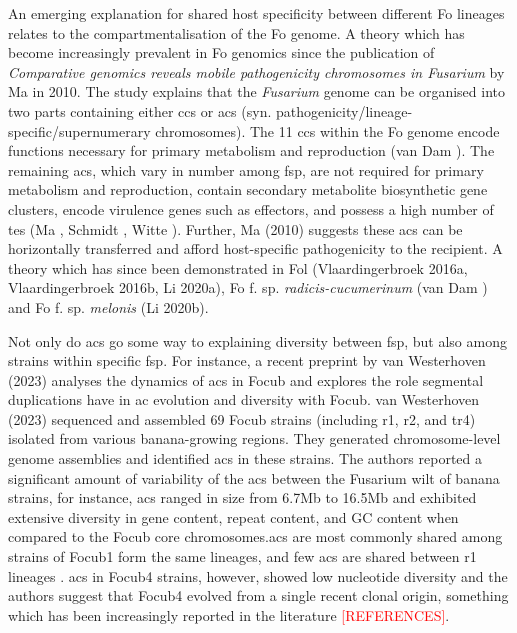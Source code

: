 An emerging explanation for shared host specificity between different \ac{Fo} lineages relates to the compartmentalisation of the \acl{Fo} genome. A theory which has become increasingly prevalent in \ac{Fo} genomics since the publication of \textit{Comparative genomics reveals mobile pathogenicity chromosomes in Fusarium} by Ma \et in 2010. The study explains that the \textit{Fusarium} genome can be organised into two parts containing either \acp{cc} or \acp{ac} (syn. pathogenicity/lineage-specific/supernumerary chromosomes). The 11 \acp{cc} within the \ac{Fo} genome encode functions necessary for primary metabolism and reproduction (van Dam ).  The remaining \acp{ac}, which vary in number among \ac{fsp}, are not required for primary metabolism and reproduction, contain secondary metabolite biosynthetic gene clusters, encode virulence genes such as effectors, and possess a high number of \acp{te} (Ma , Schmidt , Witte ). Further, Ma \et (2010) suggests these \acp{ac} can be horizontally transferred and afford host-specific pathogenicity to the recipient. A theory which has since been demonstrated in \ac{Fol} (Vlaardingerbroek \et 2016a, Vlaardingerbroek \et 2016b, Li \et 2020a), \ac{Fo} f. sp. \textit{radicis-cucumerinum} (van Dam ) and \ac{Fo} f. sp. \textit{melonis} (Li \et 2020b). 
 
Not only do \acp{ac} go some way to explaining diversity between \ac{fsp}, but also among strains within specific \ac{fsp}. For instance, a recent preprint by van Westerhoven \et (2023) analyses the dynamics of \acp{ac} in \ac{Focub} and explores the role segmental duplications have in \ac{ac} evolution and diversity with \ac{Focub}. van Westerhoven \et (2023) sequenced and assembled 69 \ac{Focub} strains (including \ac{r1}, \ac{r2}, and \ac{tr4})  isolated from various banana-growing regions. They generated chromosome-level genome assemblies and identified \acp{ac} in these strains.  The authors reported a significant amount of variability of the \acp{ac} between the Fusarium wilt of banana strains, for instance, \acp{ac} ranged in size from 6.7Mb to 16.5Mb and exhibited extensive diversity in gene content, repeat content, and GC content when compared to the \ac{Focub} core chromosomes.\Acp{ac} are most commonly shared among strains of \ac{Focub1} form the same lineages, and few \acp{ac} are shared between \ac{r1} lineages . \Acp{ac} in \ac{Focub4} strains, however, showed low nucleotide diversity and the authors suggest that \ac{Focub4} evolved from a single recent clonal origin, something which has been increasingly reported in the literature \textcolor{red}{[REFERENCES]}. 

